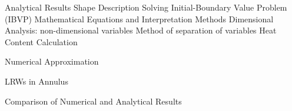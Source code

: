 \documentclass{article}
\begin{document}
\begin{outline}[enumerate]

  
  
  \1 Analytical Results
    \2 Shape Description
    \2 Solving Initial-Boundary Value Problem (IBVP)
      \3 Mathematical Equations and Interpretation
      \3 Methods
        \4 Dimensional Analysis: non-dimensional variables
        \4 Method of separation of variables
    \2 Heat Content Calculation 
    
  \1 Numerical Approximation


  \1 LRWs in Annulus


  \1 Comparison of Numerical and Analytical Results


  

\end{outline}


\newpage

\printbibliography
\end{document}
